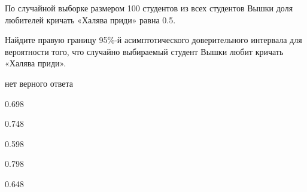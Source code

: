 
\begin{question}
По случайной выборке размером 100 студентов из всех студентов Вышки доля
любителей кричать «Халява приди» равна 0.5.

Найдите правую границу 95\%-й асимптотического доверительного интервала
для вероятности того, что случайно выбираемый студент Вышки любит
кричать «Халява приди».
\begin{answerlist}
  \item нет верного ответа
  \item 0.698
  \item 0.748
  \item 0.598
  \item 0.798
  \item 0.648
\end{answerlist}
\end{question}


